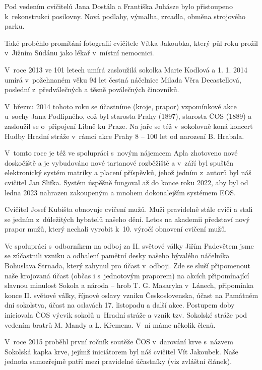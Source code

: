 \documentclass[a5paper, 11pt, twoside]{article}
\begin{document}
Pod vedením cvičitelů Jana Dostála a Františka Juhásze bylo přistoupeno
k~rekonstrukci posilovny. Nová podlahy, výmalba, zrcadla, obměna
strojového parku.

Také proběhlo promítání fotografií cvičitele Vítka Jakoubka, který půl
roku prožil v~Jižním Súdánu jako lékař v~místní nemocnici.

V~roce 2013 ve 101 letech umírá zasloužilá sokolka Marie Kodlová a 1. 1.
2014 umírá v~požehnaném věku 94 let čestná náčelnice Milada Věra
Decastellová, poslední z~předválečných a těsně poválečných činovníků.

V~březnu 2014 tohoto roku se účastníme (kroje, prapor) vzpomínkové akce
u~sochy Jana Podlipného, což byl starosta Prahy (1897), starosta ČOS
(1889) a zasloužil se o~připojení Libně ku Praze. Na jaře se též
v~sokolovně koná koncert Hudby Hradní stráže v~rámci akce Prahy 8 -- 100
let od narození B. Hrabala.

V~tomto roce je též ve spolupráci s~novým nájemcem Apla zhotoveno nové
doskočiště a je vybudováno nové tartanové rozběžiště a v~září byl
spuštěn elektronický systém matriky a placení příspěvků, jehož jedním
z~autorů byl náš cvičitel Jan Slifka. Systém úspěšně fungoval až do konce
roku 2022, aby byl od ledna 2023 nahrazen zakoupeným a mnohem
dokonalejším systémem EOS.

Cvičitel Josef Kubišta obnovuje cvičení mužů. Muži pravidelně stále
cvičí a stali se jedním z~důležitých hybatelů našeho dění. Letos na
akademii představí nový prapor mužů, který nechali vyrobit k~10. výročí
obnovení cvičení mužů.

Ve spolupráci s~odborníkem na odboj za II. světové války Jiřím Padevětem
jsme se zúčastnili vzniku a odhalení pamětní desky našeho bývalého
náčelníka Bohuslava Strnada, který zahynul pro účast v~odboji. Zde se
sluší připomenout naše krojovaná účast (občas i s~jednotovým praporem)
na akcích připomínající slavnou minulost Sokola a národa -- hrob T. G.
Masaryka v~Lánech, připomínka konce II. světové války, říjnové oslavy
vzniku Československa, účast na Památném dni sokolstva, účast na
oslavách 17. listopadu a další akce. Postupem doby iniciovala ČOS výcvik
sokolů u~Hradní stráže a vznik tzv. Sokolské stráže pod vedením bratrů
M. Mandy a L. Křemena. V~ní máme několik členů.

V~roce 2015 proběhl první ročník soutěže ČOS v~darování krve s~názvem
Sokolská kapka krve, jejímž iniciátorem byl náš cvičitel Vít Jakoubek.
Naše jednota samozřejmě patří mezi pravidelné účastníky (viz zvláštní
článek).
\end{document}
